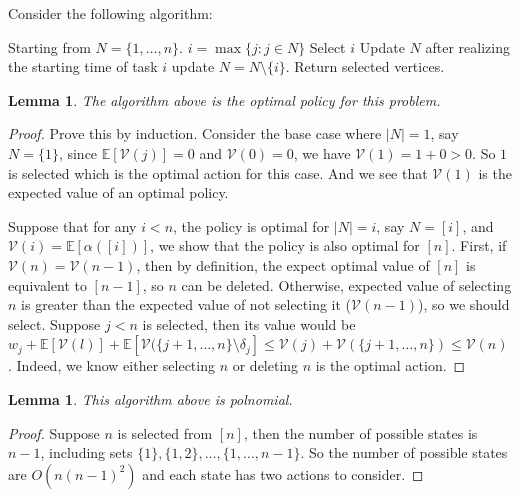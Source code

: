 \documentclass[10pt,leqno]{amsart}
\newtheorem{lemma}[theorem]{Lemma}
\newcommand{\E}{\mathbb{E}}
\newcommand{\calV}{\mathcal{V}}
\begin{document}
Consider the following algorithm:

    \begin{algorithm}
    \begin{algorithmic}
        \State Starting from $N=\{1,\ldots,n\}$.
            \State $i=\max\{j:j\in N\}$
            \If{$\calV(i)>\calV(i-1)$}
            \State Select $i$
            \State Update $N$ after realizing the starting time of task $i$
            \Else 
            \State update $N=N\setminus\{i\}$.
            \EndIf
        \EndWhile
        \State Return selected vertices.
        \end{algorithmic}
    \end{algorithm}


\begin{lemma}
    The algorithm above is the optimal policy for this problem.
\end{lemma}
\begin{proof}
    Prove this by induction.
    Consider the base case where $|N|=1$, say $N=\{1\}$, since $\E[\calV(j)]=0$ and $\calV(0)=0$, we have 
    $\calV(1)=1+0>0$. So $1$ is selected which is the optimal action for this case. And we see that $\calV(1)$ is the expected value of an optimal policy.

    Suppose that for any $i<n$, the policy is optimal for $|N|=i$, say $N=[i]$, and $\calV(i)=\E[\alpha([i])]$, we show that the policy is also optimal for $[n]$.
    First, if $\calV(n)=\calV(n-1)$, then by definition, the expect optimal value of $[n]$ is equivalent to $[n-1]$, so $n$ can be deleted.
    Otherwise, expected value of selecting $n$ is greater than the expected value of not selecting it ($\calV(n-1)$), so we should select.
    Suppose $j<n$ is selected, then its value would be $w_j+\E[\calV(l)]+\E[\calV(\{j+1,\ldots,n\}\setminus\delta_j]\leq\calV(j)+\calV(\{j+1,\ldots,n\})\leq \calV(n)$.
    Indeed, we know either selecting $n$ or deleting $n$ is the optimal action.
\end{proof}
\begin{lemma}
    This algorithm above is polnomial.
\end{lemma}
\begin{proof}
    Suppose $n$ is selected from $[n]$, then the number of possible states is $n-1$, including sets $\{1\},\{1,2\},\ldots,\{1,\ldots,n-1\}$. So the number of possible states are $O(n(n-1)^2)$ and each state has two actions to consider.
\end{proof}
\end{document}

